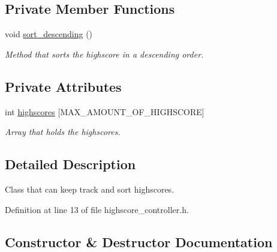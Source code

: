 \subsection*{Private Member Functions}
\begin{DoxyCompactItemize}
\item 
void \hyperlink{classhighscore__controller_a17475afc6719262f8a20ec5ff860e06b}{sort\+\_\+descending} ()\hypertarget{classhighscore__controller_a17475afc6719262f8a20ec5ff860e06b}{}\label{classhighscore__controller_a17475afc6719262f8a20ec5ff860e06b}

\begin{DoxyCompactList}\small\item\em Method that sorts the highscore in a descending order. \end{DoxyCompactList}\end{DoxyCompactItemize}
\subsection*{Private Attributes}
\begin{DoxyCompactItemize}
\item 
int \hyperlink{classhighscore__controller_a40f4306723a0a0cb5fb5fb58082570fe}{highscores} \mbox{[}M\+A\+X\+\_\+\+A\+M\+O\+U\+N\+T\+\_\+\+O\+F\+\_\+\+H\+I\+G\+H\+S\+C\+O\+RE\mbox{]}\hypertarget{classhighscore__controller_a40f4306723a0a0cb5fb5fb58082570fe}{}\label{classhighscore__controller_a40f4306723a0a0cb5fb5fb58082570fe}

\begin{DoxyCompactList}\small\item\em Array that holds the highscores. \end{DoxyCompactList}\end{DoxyCompactItemize}


\subsection{Detailed Description}
Class that can keep track and sort highscores. 

Definition at line 13 of file highscore\+\_\+controller.\+h.



\subsection{Constructor \& Destructor Documentation}
